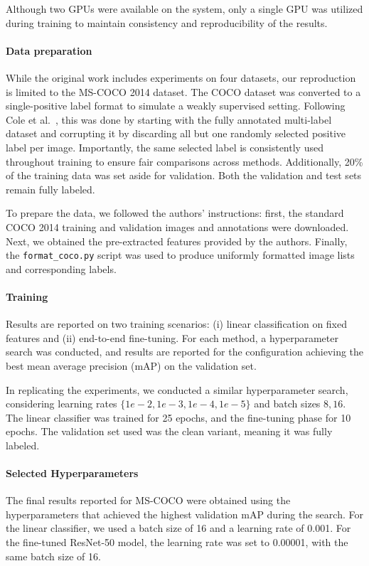 \documentclass[lettersize,journal]{IEEEtran}
\begin{document}
Although two GPUs were available on the system, only a single GPU was utilized during training to maintain consistency and reproducibility of the results.

\paragraph{Data preparation}
While the original work includes experiments on four datasets, our reproduction is limited to the MS-COCO 2014 dataset. The COCO dataset was converted to a single-positive label format to simulate a weakly supervised setting. Following Cole et al.~\cite{mlsp}, this was done by starting with the fully annotated multi-label dataset and corrupting it by discarding all but one randomly selected positive label per image. Importantly, the same selected label is consistently used throughout training to ensure fair comparisons across methods. Additionally, 20\% of the training data was set aside for validation. Both the validation and test sets remain fully labeled.

To prepare the data, we followed the authors' instructions: first, the standard COCO 2014 training and validation images and annotations were downloaded. Next, we obtained the pre-extracted features provided by the authors. Finally, the \texttt{format\_coco.py} script was used to produce uniformly formatted image lists and corresponding labels.


\paragraph{Training}
Results are reported on two training scenarios: (i) linear classification on fixed features and (ii) end-to-end fine-tuning. For each method, a hyperparameter search was conducted, and results are reported for the configuration achieving the best mean average precision (mAP) on the validation set.

In replicating the experiments, we conducted a similar hyperparameter search, considering learning rates  $\{1e-2, 1e-3, 1e-4, 1e-5\}$ and batch sizes ${8, 16}$. The linear classifier was trained for 25 epochs, and the fine-tuning phase for 10 epochs. The validation set used was the clean variant, meaning it was fully labeled.

\paragraph{Selected Hyperparameters}
The final results reported for MS-COCO were obtained using the hyperparameters that achieved the highest validation mAP during the search. For the linear classifier, we used a batch size of 16 and a learning rate of 0.001. For the fine-tuned ResNet-50 model, the learning rate was set to 0.00001, with the same batch size of 16.
\end{document}
